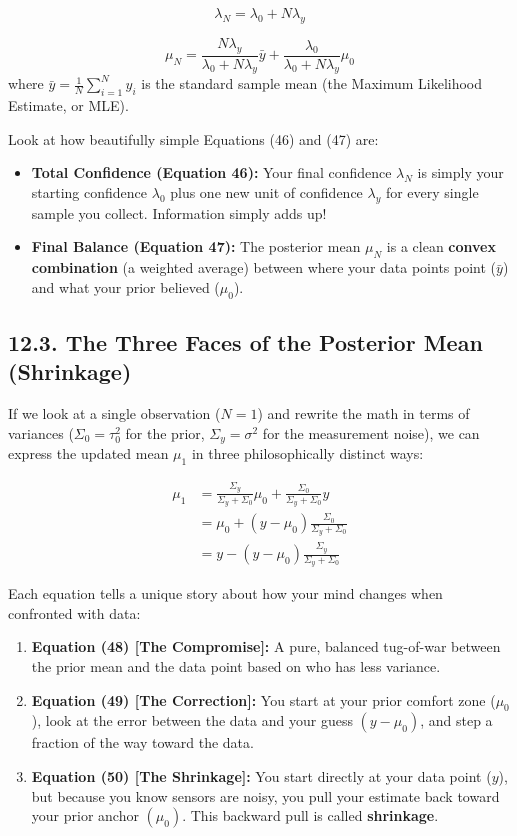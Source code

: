 \documentclass{article}
\begin{document}
\begin{equation}
\lambda_N = \lambda_0 + N\lambda_y \tag{46}
\end{equation}

\begin{equation}
\mu_N = \frac{N\lambda_y}{\lambda_0 + N\lambda_y}\bar{y} + \frac{\lambda_0}{\lambda_0 + N\lambda_y}\mu_0 \tag{47}
\end{equation}
where $\bar{y} = \frac{1}{N}\sum_{i=1}^N y_i$ is the standard sample mean (the Maximum Likelihood Estimate, or MLE).

Look at how beautifully simple Equations (46) and (47) are:
\begin{itemize}
    \item \textbf{Total Confidence (Equation 46):} Your final confidence $\lambda_N$ is simply your starting confidence $\lambda_0$ plus one new unit of confidence $\lambda_y$ for every single sample you collect. Information simply adds up!
    \item \textbf{Final Balance (Equation 47):} The posterior mean $\mu_N$ is a clean \textbf{convex combination} (a weighted average) between where your data points point ($\bar{y}$) and what your prior believed ($\mu_0$). 
\end{itemize}

\subsection*{12.3. The Three Faces of the Posterior Mean (Shrinkage)}
If we look at a single observation ($N=1$) and rewrite the math in terms of variances ($\Sigma_0 = \tau_0^2$ for the prior, $\Sigma_y = \sigma^2$ for the measurement noise), we can express the updated mean $\mu_1$ in three philosophically distinct ways:

\begin{align}
\mu_1 &= \frac{\Sigma_y}{\Sigma_y + \Sigma_0}\mu_0 + \frac{\Sigma_0}{\Sigma_y + \Sigma_0}y \tag{48} \\[0.5em]
&= \mu_0 + (y - \mu_0)\frac{\Sigma_0}{\Sigma_y + \Sigma_0} \tag{49} \\[0.5em]
&= y - (y - \mu_0)\frac{\Sigma_y}{\Sigma_y + \Sigma_0} \tag{50}
\end{align}

Each equation tells a unique story about how your mind changes when confronted with data:
\begin{enumerate}
    \item \textbf{Equation (48) [The Compromise]:} A pure, balanced tug-of-war between the prior mean and the data point based on who has less variance.
    \item \textbf{Equation (49) [The Correction]:} You start at your prior comfort zone ($\mu_0$), look at the error between the data and your guess $(y - \mu_0)$, and step a fraction of the way toward the data.
    \item \textbf{Equation (50) [The Shrinkage]:} You start directly at your data point ($y$), but because you know sensors are noisy, you pull your estimate back toward your prior anchor $(\mu_0)$. This backward pull is called \textbf{shrinkage}.
\end{enumerate}
\end{document}
